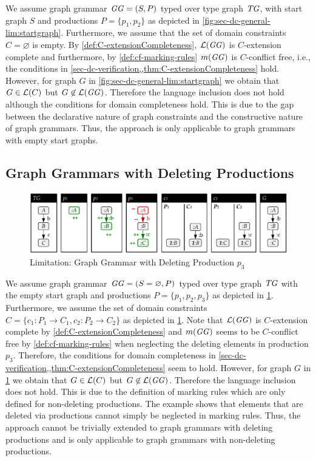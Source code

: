 We assume graph grammar $\mathit{GG}=(S,P)$ typed over type graph $\mathit{TG}$, with start graph $S$ and productions $P=\{p_1,p_2\}$ as depicted in \cref{fig:sec-dc-general-lim:startgraph}.
Furthermore, we assume that the set of domain constraints $C=\varnothing$ is empty.
By \cref{def:C-extensionCompleteness}, $\mathcal{L}(\mathit{GG})$ is $C$-extension complete and furthermore, by \cref{def:cf-marking-rules} $m(\mathit{GG})$ is $C$-conflict free, i.e., the conditions in \cref{sec-dc-verification,,thm:C-extensionCompleteness} hold.
However, for graph $G$ in \cref{fig:sec-dc-general-lim:startgraph} we obtain that $G \in \mathcal{L}(C)$ but $G \not\in \mathcal{L}(\mathit{GG})$.
Therefore the language inclusion does not hold although the conditions for domain completeness hold.
This is due to the gap between the declarative nature of graph constraints and the constructive nature of graph grammars.
Thus, the approach is only applicable to graph grammars with empty start graphs.

\subsection{Graph Grammars with Deleting Productions}

\begin{figure}[!tb]
\begin{center}
\includegraphics[width=\textwidth]{img/limitations/deleting.pdf}
\end{center}
\caption{Limitation: Graph Grammar with Deleting Production $p_3$}
\label{fig:sec-dc-general-lim:deleting}
\end{figure}

We assume graph grammar $\mathit{GG}=(S=\varnothing,P)$ typed over type graph $\mathit{TG}$ with the empty start graph and productions $P=\{p_1,p_2,p_3\}$ as depicted in \cref{fig:sec-dc-general-lim:deleting}.
Furthermore, we assume the set of domain constraints $C=\{c_1\colon P_1 \to C_1,c_2\colon P_2 \to C_2\}$ as depicted in \cref{fig:sec-dc-general-lim:deleting}.
Note that $\mathcal{L}(\mathit{GG})$ is $C$-extension complete by \cref{def:C-extensionCompleteness} and $m(\mathit{GG})$ seems to be $C$-conflict free by \cref{def:cf-marking-rules} when neglecting the deleting elements in production $p_3$.
Therefore, the conditions for domain completeness in \cref{sec-dc-verification,,thm:C-extensionCompleteness} seem to hold.
However, for graph $G$ in \cref{fig:sec-dc-general-lim:deleting} we obtain that $G \in \mathcal{L}(C)$ but $G \not\in \mathcal{L}(\mathit{GG})$.
Therefore the language inclusion does not hold.
This is due to the definition of marking rules which are only defined for non-deleting productions.
The example shows that elements that are deleted via productions cannot simply be neglected in marking rules.
Thus, the approach cannot be trivially extended to graph grammars with deleting productions and is only applicable to graph grammars with non-deleting productions.

